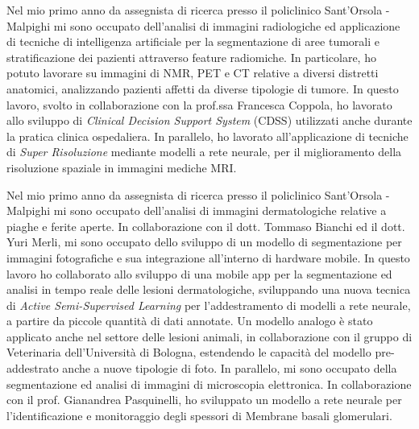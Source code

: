 {Nel mio primo anno da assegnista di ricerca presso il policlinico Sant'Orsola - Malpighi mi sono occupato dell'analisi di immagini radiologiche ed applicazione di tecniche di intelligenza artificiale per la segmentazione di aree tumorali e stratificazione dei pazienti attraverso feature radiomiche.
In particolare, ho potuto lavorare su immagini di NMR, PET e CT relative a diversi distretti anatomici, analizzando pazienti affetti da diverse tipologie di tumore.
In questo lavoro, svolto in collaborazione con la prof.ssa Francesca Coppola, ho lavorato allo sviluppo di \emph{Clinical Decision Support System} (CDSS) utilizzati anche durante la pratica clinica ospedaliera.
In parallelo, ho lavorato all'applicazione di tecniche di \emph{Super Risoluzione} mediante modelli a rete neurale, per il miglioramento della risoluzione spaziale in immagini mediche MRI.

Nel mio primo anno da assegnista di ricerca presso il policlinico Sant'Orsola - Malpighi mi sono occupato dell'analisi di immagini dermatologiche relative a piaghe e ferite aperte.
In collaborazione con il dott. Tommaso Bianchi ed il dott. Yuri Merli, mi sono occupato dello sviluppo di un modello di segmentazione per immagini fotografiche e sua integrazione all'interno di hardware mobile.
In questo lavoro ho collaborato allo sviluppo di una mobile app per la segmentazione ed analisi in tempo reale delle lesioni dermatologiche, sviluppando una nuova tecnica di \emph{Active Semi-Supervised Learning} per l'addestramento di modelli a rete neurale, a partire da piccole quantità di dati annotate.
Un modello analogo è stato applicato anche nel settore delle lesioni animali, in collaborazione con il gruppo di Veterinaria dell'Università di Bologna, estendendo le capacità del modello pre-addestrato anche a nuove tipologie di foto.
In parallelo, mi sono occupato della segmentazione ed analisi di immagini di microscopia elettronica.
In collaborazione con il prof. Gianandrea Pasquinelli, ho sviluppato un modello a rete neurale per l'identificazione e monitoraggio degli spessori di Membrane basali glomerulari.

\vspace*{0.5cm}
} {

}
